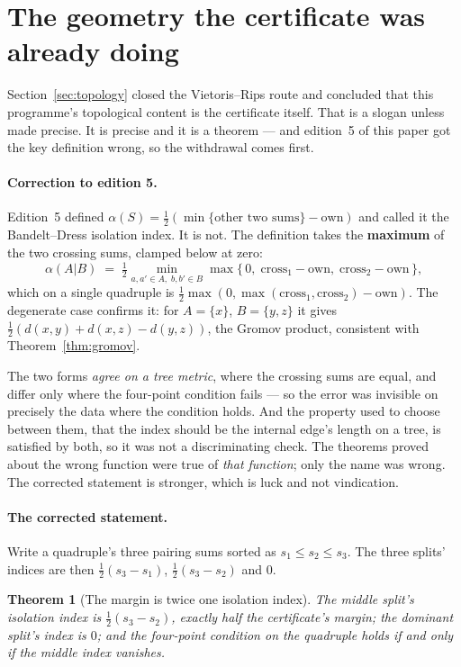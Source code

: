 \documentclass[11pt,a4paper]{article}
\newtheorem{theorem}{Theorem}[section]
\theoremstyle{definition}
\theoremstyle{remark}
\begin{document}
\section{The geometry the certificate was already doing}\label{sec:geometry}

Section~\ref{sec:topology} closed the Vietoris--Rips route and concluded that
this programme's topological content is the certificate itself. That is a slogan
unless made precise. It is precise and it is a theorem --- and edition~5 of this
paper got the key definition wrong, so the withdrawal comes first.

\paragraph{Correction to edition 5.} Edition~5 defined
$\alpha(S) = \tfrac12(\min\{\text{other two sums}\} - \text{own})$ and called it
the Bandelt--Dress isolation index. It is not. The definition takes the
\textbf{maximum} of the two crossing sums, clamped below at zero:
\[
  \alpha(A|B) \;=\; \tfrac12 \min_{a,a' \in A,\; b,b' \in B}
    \max\{\,0,\; \mathrm{cross}_1 - \mathrm{own},\; \mathrm{cross}_2 - \mathrm{own}\,\},
\]
which on a single quadruple is
$\tfrac12 \max(0, \max(\mathrm{cross}_1, \mathrm{cross}_2) - \mathrm{own})$. The
degenerate case confirms it: for $A = \{x\}$, $B = \{y,z\}$ it gives
$\tfrac12(d(x,y) + d(x,z) - d(y,z))$, the Gromov product, consistent with
Theorem~\ref{thm:gromov}.

The two forms \emph{agree on a tree metric}, where the crossing sums are equal,
and differ only where the four-point condition fails --- so the error was
invisible on precisely the data where the condition holds. And the property used
to choose between them, that the index should be the internal edge's length on a
tree, is satisfied by both, so it was not a discriminating check. The theorems
proved about the wrong function were true of \emph{that function}; only the name
was wrong. The corrected statement is stronger, which is luck and not
vindication.

\paragraph{The corrected statement.} Write a quadruple's three pairing sums
sorted as $s_1 \le s_2 \le s_3$. The three splits' indices are then
$\tfrac12(s_3-s_1)$, $\tfrac12(s_3-s_2)$ and $0$.

\begin{theorem}[The margin is twice one isolation index]\label{thm:isoindex}
The middle split's isolation index is $\tfrac12(s_3-s_2)$, exactly half the
certificate's margin; the dominant split's index is $0$; and the four-point
condition on the quadruple holds if and only if the middle index vanishes.
\end{theorem}
\end{document}
